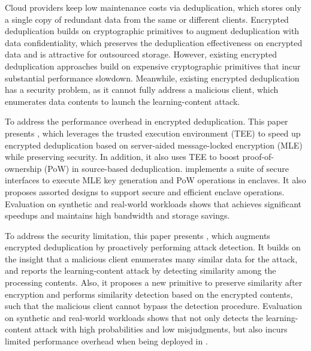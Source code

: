 \begin{englishabstract}
    Cloud providers keep low maintenance costs via deduplication, which stores only a single copy of redundant data from the same or different clients.
    Encrypted deduplication builds on cryptographic primitives to augment deduplication with data confidentiality, which preserves the deduplication effectiveness on encrypted data and is attractive for outsourced storage. However, existing encrypted deduplication approaches build on expensive cryptographic primitives that incur substantial performance slowdown. Meanwhile, existing encrypted deduplication has a security problem, as it cannot fully address a malicious client, which enumerates data contents to launch the learning-content attack.

    To address the performance overhead in encrypted deduplication. This paper presents \sysnameS, which leverages the trusted execution environment (TEE) to speed up encrypted deduplication based on server-aided message-locked encryption (MLE) while preserving security. In addition, it also uses TEE to boost proof-of-ownership (PoW) in source-based deduplication. \sysnameS implements a suite of secure interfaces to execute MLE key generation and PoW operations in enclaves. It also proposes assorted designs to support secure and efficient enclave operations. Evaluation on synthetic and real-world workloads shows that \sysnameS achieves significant speedups and maintains high bandwidth and storage savings.

    To address the security limitation, this paper presents \sysnameF, which augments encrypted deduplication by proactively performing attack detection. It builds on the insight that a malicious client enumerates many similar data for the attack, and reports the learning-content attack by detecting similarity among the processing contents. Also, it proposes a new primitive to preserve similarity after encryption and performs similarity detection based on the encrypted contents, such that the malicious client cannot bypass the detection procedure. Evaluation on synthetic and real-world workloads shows that \sysnameF not only detects the learning-content attack with high probabilities and low misjudgments, but also incurs limited performance overhead when being deployed in \sysnameS.

\end{englishabstract}